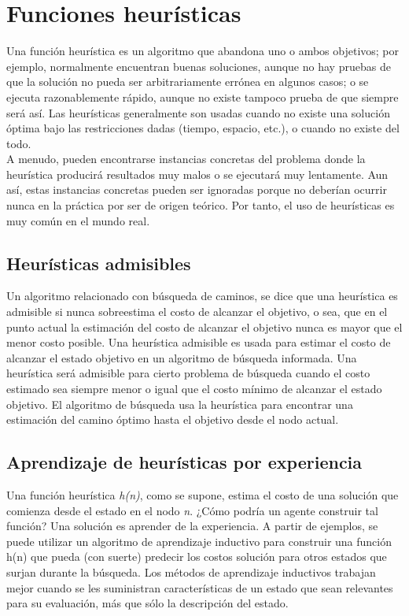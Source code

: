 \documentclass[12pt,a4paper]{report}
\begin{document}
\section{Funciones heurísticas}
Una función heurística es un algoritmo que abandona uno o ambos objetivos; por ejemplo, normalmente encuentran buenas soluciones, aunque no hay pruebas de que la solución no pueda ser arbitrariamente errónea en algunos casos; o se ejecuta razonablemente rápido, aunque no existe tampoco prueba de que siempre será así. Las heurísticas generalmente son usadas cuando no existe una solución óptima bajo las restricciones dadas (tiempo, espacio, etc.), o cuando no existe del todo.\\A menudo, pueden encontrarse instancias concretas del problema donde la heurística producirá resultados muy malos o se ejecutará muy lentamente. Aun así, estas instancias concretas pueden ser ignoradas porque no deberían ocurrir nunca en la práctica por ser de origen teórico. Por tanto, el uso de heurísticas es muy común en el mundo real.
\subsection*{Heurísticas admisibles}
Un algoritmo relacionado con búsqueda de caminos, se dice que una heurística es admisible si nunca sobreestima el costo de alcanzar el objetivo, o sea, que en el punto actual la estimación del costo de alcanzar el objetivo nunca es mayor que el menor costo posible. Una heurística admisible es usada para estimar el costo de alcanzar el estado objetivo en un algoritmo de búsqueda informada. Una heurística será admisible para cierto problema de búsqueda cuando el costo estimado sea siempre menor o igual que el costo mínimo de alcanzar el estado objetivo. El algoritmo de búsqueda usa la heurística para encontrar una estimación del camino óptimo hasta el objetivo desde el nodo actual.
\subsection*{Aprendizaje de heurísticas por experiencia}
Una función heurística \emph{h(n)}, como se supone, estima el costo de una solución que comienza desde el estado en el nodo \emph{n}. ¿Cómo podría un agente construir tal función? Una solución es aprender de la experiencia. A partir de ejemplos, se puede utilizar un algoritmo de aprendizaje inductivo para construir una función h(n) que pueda (con suerte) predecir los costos solución para otros estados que surjan durante la búsqueda. Los métodos de aprendizaje inductivos trabajan mejor cuando se les suministran características de un estado que sean relevantes para su evaluación, más que sólo la descripción del estado.
\end{document}
